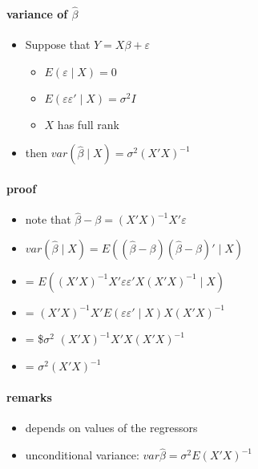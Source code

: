 \paragraph{variance of $\hat \beta$}
\begin{itemize}
\item Suppose that $Y = X\beta + \varepsilon$
\begin{itemize}
\item $E(\varepsilon \mid X) = 0$
\item $E(\varepsilon \varepsilon' \mid X) = \sigma^2 I$
\item $X$ has full rank
\end{itemize}
\item then $var(\hat \beta \mid X) = \sigma^2 (X'X)^{-1}$
\end{itemize}

\paragraph{proof}
\begin{itemize}
\item note that $\hat\beta - \beta = (X'X)^{-1}X'\varepsilon$
\item $var(\hat \beta \mid X) = E((\hat\beta -
         \beta)(\hat\beta-\beta)' \mid X)$
\item = $E((X'X)^{-1}X'\varepsilon\varepsilon'X(X'X)^{-1} \mid X)$
\item = $(X'X)^{-1} X' E(\varepsilon\varepsilon' \mid X) X (X'X)^{-1}$
\item = \$$\sigma$$^2$ $(X'X)^{-1} X'X (X'X)^{-1}$
\item = $\sigma^2 (X'X)^{-1}$
\end{itemize}

\paragraph{remarks}
\begin{itemize}
\item depends on values of the regressors
\item unconditional variance: $var \hat \beta = \sigma^2 E
         (X'X)^{-1}$
\end{itemize}

